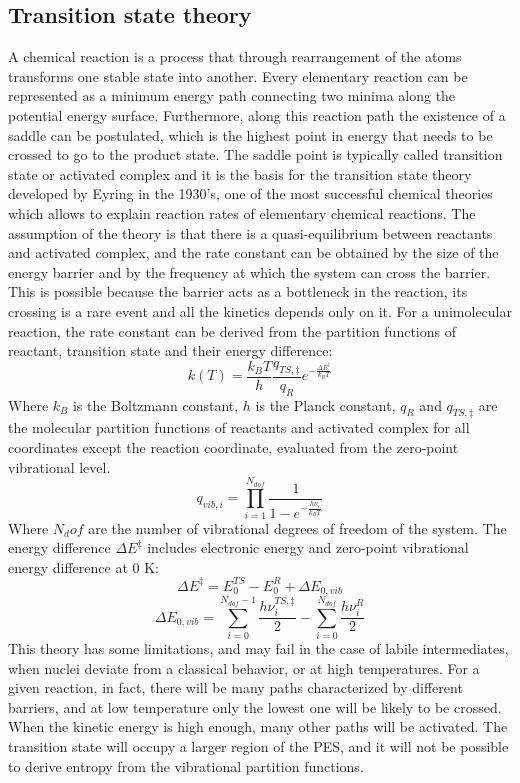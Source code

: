 \subsection{Transition state theory}
A chemical reaction is a process that through rearrangement of the atoms transforms one stable state into another. Every elementary reaction can be represented as a minimum energy path connecting two minima along the potential energy surface. Furthermore, along this reaction path the existence of a saddle can be postulated, which is the highest point in energy that needs to be crossed to go to the product state. 
The saddle point is typically called transition state or activated complex and it is the basis for the transition state theory developed by Eyring in the 1930’s, one of the most successful chemical theories which allows to explain reaction rates of elementary chemical reactions. The assumption of the theory is that there is a quasi-equilibrium between reactants and activated complex, and the rate constant can be obtained by the size of the energy barrier and by the frequency at which the system can cross the barrier. This is possible because the barrier acts as a bottleneck in the reaction, its crossing is a rare event and all the kinetics depends only on it. For a unimolecular reaction, the rate constant can be derived from the partition functions of reactant, transition state and their energy difference:
\[
k(T) = \dfrac{{k_B T}}{h}
\dfrac{{q_{TS,\ddagger}}}{{q_R}} e^{- \frac{\Delta E^{\ddagger}}{k_B T}}
\]
Where $k_B$ is the Boltzmann constant, $h$ is the Planck constant, $q_R$  and  $q_{TS,\ddagger}$ are the molecular partition functions of reactants and activated complex for all coordinates except the reaction coordinate, evaluated from the zero-point vibrational level. 
\[
q_{vib,i} = \prod_{i=1}^{N_{dof}} \dfrac{1}{1 - e^{- \frac{h \nu_{i}}{k_B T}}}
\]
Where $N_dof$ are the number of vibrational degrees of freedom of the system. The energy difference $\Delta E^{\ddagger}$ includes electronic energy and zero-point vibrational energy difference at 0 K:
\[
\Delta E^{\ddagger} = E_{0}^{TS} - E_{0}^{R} + \Delta E_{0,vib}
\]
\[
\Delta E_{0,vib} = \sum_{i=0}^{N_{dof}-1} \frac{h \nu_{i}^{TS,\ddagger}}{2}
- \sum_{i=0}^{N_{dof}} \frac{h \nu_{i}^{R}}{2}
\]
This theory has some limitations, and may fail in the case of labile intermediates, when nuclei deviate from a classical behavior, or at high temperatures. For a given reaction, in fact, there will be many paths characterized by different barriers, and at low temperature only the lowest one will be likely to be crossed. When the kinetic energy is high enough, many other paths will be activated. The transition state will occupy a larger region of the PES, and it will not be possible to derive entropy from the vibrational partition functions.

